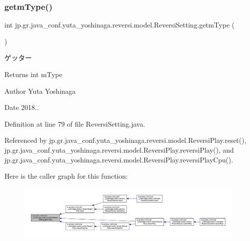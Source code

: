 \subsubsection{\texorpdfstring{getm\+Type()}{getmType()}}
{\footnotesize\ttfamily int jp.\+gr.\+java\+\_\+conf.\+yuta\+\_\+yoshinaga.\+reversi.\+model.\+Reversi\+Setting.\+getm\+Type (\begin{DoxyParamCaption}{ }\end{DoxyParamCaption})}



ゲッター 

\begin{DoxyReturn}{Returns}
int m\+Type 
\end{DoxyReturn}
\begin{DoxyAuthor}{Author}
Yuta Yoshinaga 
\end{DoxyAuthor}
\begin{DoxyDate}{Date}
2018.. 
\end{DoxyDate}


Definition at line 79 of file Reversi\+Setting.\+java.



Referenced by jp.\+gr.\+java\+\_\+conf.\+yuta\+\_\+yoshinaga.\+reversi.\+model.\+Reversi\+Play.\+reset(), jp.\+gr.\+java\+\_\+conf.\+yuta\+\_\+yoshinaga.\+reversi.\+model.\+Reversi\+Play.\+reversi\+Play(), and jp.\+gr.\+java\+\_\+conf.\+yuta\+\_\+yoshinaga.\+reversi.\+model.\+Reversi\+Play.\+reversi\+Play\+Cpu().

Here is the caller graph for this function\+:
\nopagebreak
\begin{figure}[H]
\begin{center}
\leavevmode
\includegraphics[width=350pt]{classjp_1_1gr_1_1java__conf_1_1yuta__yoshinaga_1_1reversi_1_1model_1_1_reversi_setting_a4bdf61298cd8918aa2c7f4b8d217b8ef_icgraph}
\end{center}
\end{figure}
\mbox{\label{classjp_1_1gr_1_1java__conf_1_1yuta__yoshinaga_1_1reversi_1_1model_1_1_reversi_setting_afef8530666d1ce3522fd53938cd00353}} 
